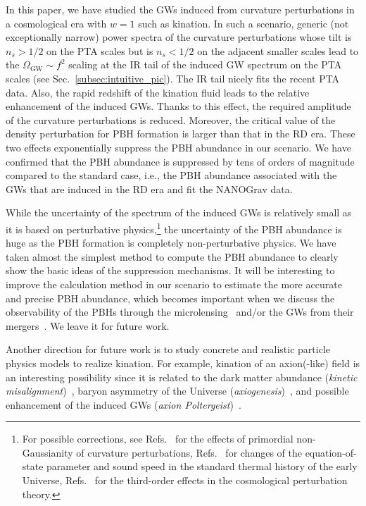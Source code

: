 \documentclass[superscriptaddress, aps, preprintnumbers,
amsmath, amssymb, sort&compress, nofootinbib, 10pt, paper, floatfix]{revtex4-2}
\begin{document}
In this paper, we have studied the GWs induced from curvature perturbations in a cosmological era with $w=1$ such as kination.  
In such a scenario, generic (not exceptionally narrow) power spectra of the curvature perturbations whose tilt is $n_s > 1/2$ on the PTA scales but is $n_s < 1/2$ on the adjacent smaller scales lead to the $\Omega_\text{GW} \sim f^2$ scaling at the IR tail of the induced GW spectrum on the PTA scales (see Sec.~\ref{subsec:intuitive_pic}).
The IR tail nicely fits the recent PTA data.  Also, the rapid redshift of the kination fluid leads to the relative enhancement of the induced GWs. Thanks to this effect, the required amplitude of the curvature perturbations is reduced.  Moreover, the critical value of the density perturbation for PBH formation is larger than that in the RD era. These two effects exponentially suppress the PBH abundance in our scenario. We have confirmed that the PBH abundance is suppressed by tens of orders of magnitude compared to the standard case, i.e., the PBH abundance associated with the GWs that are induced in the RD era and fit the NANOGrav data.


While the uncertainty of the spectrum of the induced GWs is relatively small as it is based on perturbative physics,\footnote{
For possible corrections, see Refs.~\cite{Nakama:2016gzw, Garcia-Bellido:2017aan,  Cai:2018dig, Unal:2018yaa, Yuan:2020iwf, Atal:2021jyo, Adshead:2021hnm,Garcia-Saenz:2022tzu, Li:2023qua, Yuan:2023ofl} for the effects of primordial non-Gaussianity of curvature perturbations, Refs.~\cite{Abe:2020sqb, Franciolini:2023wjm, Abe:2023yrw} for changes of the equation-of-state parameter and sound speed in the standard thermal history of the early Universe, Refs.~\cite{Yuan:2019udt, Zhou:2021vcw, Chang:2022nzu, Zhu:2023faa} for the third-order effects in the cosmological perturbation theory.
} the uncertainty of the PBH abundance is huge as the PBH formation is completely non-perturbative physics. We have taken almost the simplest method to compute the PBH abundance to clearly show the basic ideas of the suppression mechanisms. It will be interesting to improve the calculation method in our scenario to estimate the more accurate and precise PBH abundance, which becomes important when we discuss the observability of the PBHs through the microlensing~\cite{2017Natur.548..183M,Niikura:2017zjd,Niikura:2019kqi} and/or the GWs from their mergers~\cite{Wang:2019kaf,Inomata:2023zup}.
We leave it for future work.  

Another direction for future work is to study concrete and realistic particle physics models to realize kination.  For example, kination of an axion(-like) field is an interesting possibility since it is related to the dark matter abundance (\textit{kinetic misalignment})~\cite{Co:2019jts,Eroncel:2022vjg}, baryon asymmetry of the Universe (\textit{axiogenesis})~\cite{Co:2019wyp}, and possible enhancement of the induced GWs (\textit{axion Poltergeist})~\cite{Harigaya:2023ecg}.
\end{document}
